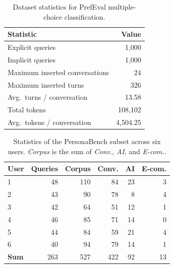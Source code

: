 \begin{table}[t]
\centering
\begin{tabular}{l r}
\toprule
\textbf{Statistic} & \textbf{Value} \\
\midrule
Explicit queries & 1{,}000 \\
Implicit queries & 1{,}000 \\
Maximum inserted conversations & 24 \\
Maximum inserted turns & 326 \\
Avg.\ turns / conversation & 13.58 \\
Total tokens & 108{,}102 \\
Avg.\ tokens / conversation & 4{,}504.25 \\
\bottomrule
\end{tabular}
\caption{Dataset statistics for PrefEval multiple-choice classification.}
\label{tab:prefeval_stats}
\end{table}

\begin{table}[t]
\centering
\small
\begin{tabular}{lrrrrr}
\toprule
\textbf{User} & \textbf{Queries} & \textbf{Corpus} & \textbf{Conv.} & \textbf{AI} & \textbf{E-com.} \\
\midrule
1 & 48 & 110 & 84 & 23 & 3 \\
2 & 43 & 90  & 78 & 8  & 4 \\
3 & 42 & 64  & 51 & 12 & 1 \\
4 & 46 & 85  & 71 & 14 & 0 \\
5 & 44 & 84  & 59 & 21 & 4 \\
6 & 40 & 94  & 79 & 14 & 1 \\
\midrule
\textbf{Sum} & 263 & 527 & 422 & 92 & 13 \\
\bottomrule
\end{tabular}
\caption{Statistics of the PersonaBench subset across six users. \textit{Corpus} is the sum of \textit{Conv.}, \textit{AI}, and \textit{E-com.}.}
\label{tab:personabench-stats}
\end{table}


